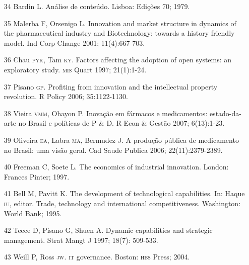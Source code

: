 \documentclass{article}
\begin{document}
\begin{itemize}
\item[34] Bardin L. Análise de conteúdo. Lisboa: Edições 70; 1979.

\item[35] Malerba F, Orsenigo L. Innovation and market structure in dynamics
of the pharmaceutical industry and Biotechnology: towards a history friendly
model. Ind Corp Change 2001; 11(4):667-703.

\item[36] Chau \textsc{pyk}, Tam \textsc{ky}. Factors affecting the adoption of open systems:
an exploratory study. \textsc{mis} Quart 1997; 21(1):1-24.

\item[37] Pisano \textsc{gp}. Profiting from innovation and the intellectual property
revolution. R Policy 2006; 35:1122-1130.

\item[38] Vieira \textsc{vmm}, Ohayon P. Inovação em fármacos e medicamentos:
estado-da-arte no Brasil e políticas de P \& D. R Econ \& Gestão 2007;
6(13):1-23.

\item[39] Oliveira \textsc{ea}, Labra \textsc{ma}, Bermudez J. A produção pública de
medicamento no Brasil: uma visão geral. Cad Saude Publica 2006;
22(11):2379-2389.

\item[40] Freeman C, Soete L. The economics of industrial innovation.
London: Frances Pinter; 1997.

\item[41] Bell M, Pavitt K. The development of technological capabilities.
In: Haque \textsc{iu}, editor. Trade, technology and international competitiveness.
Washington: World Bank; 1995.

\item[42] Teece D, Pisano G, Shuen A. Dynamic capabilities and strategic
management. Strat Mangt J 1997; 18(7): 509-533.

\item[43] Weill P, Ross \textsc{jw}. \textsc{it} governance. Boston: \textsc{hbs} Press; 2004.

\end{itemize}
\end{document}
